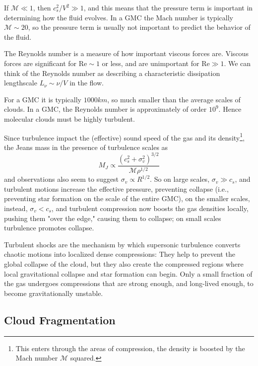 If $\mathcal{M} \ll 1$, then $c_{s}^{2}/V^{2}\gg 1$, and this means that the pressure term is important in determining how the fluid evolves. In a GMC the Mach number is typically $\mathcal{M}\sim 20$, so the pressure term is usually not important to predict the behavior of the fluid.
\par The Reynolds number is a measure of how important viscous forces are. Viscous forces are significant for $\text{Re} \sim 1$ or less, and are unimportant for $\text{Re} \gg 1$. We can think of the Reynolds number as describing a characteristic dissipation lengthscale $L_{\nu} \sim \nu/V$ in the flow.
\par For a GMC it is typically $1000\unit{km}$, so much smaller than the average scales of clouds. In a GMC, the Reynolds number is approximately of order $10^{9}$. Hence molecular clouds must be highly turbulent.
\par Since turbulence impact the (effective) sound speed of the gas and its density\footnote{This enters through the areas of compression, the density is boosted by the Mach number $\mathcal{M}$ squared.}, the Jeans mass in the presence of turbulence scales as
\begin{equation*}
    M_{J}\propto \frac{(c_{s}^{2}+\sigma_{v}^{2})^{3/2}}{\mathcal{M}\rho^{1/2}}
\end{equation*}
and observations also seem to suggest $\sigma_{v}\propto R^{1/2}$. So on large scales, $\sigma_{v}\gg c_{s}$, and turbulent motions increase the effective pressure, preventing collapse (i.e., preventing star formation on the scale of the entire GMC), on the smaller scales, instead, $\sigma_{v}<c_{s}$, and turbulent compression now boosts the gas densities locally, pushing them "over the edge," causing them to collapse; on small scales turbulence promotes collapse.
\par Turbulent shocks are the mechanism by which supersonic turbulence converts chaotic motions into localized dense compressions: They help to prevent the global collapse of the cloud, but they also create the compressed regions where local gravitational collapse and star formation can begin. Only a small fraction of the gas undergoes compressions that are strong enough, and long-lived enough, to become gravitationally unstable.

\subsection{Cloud Fragmentation}

